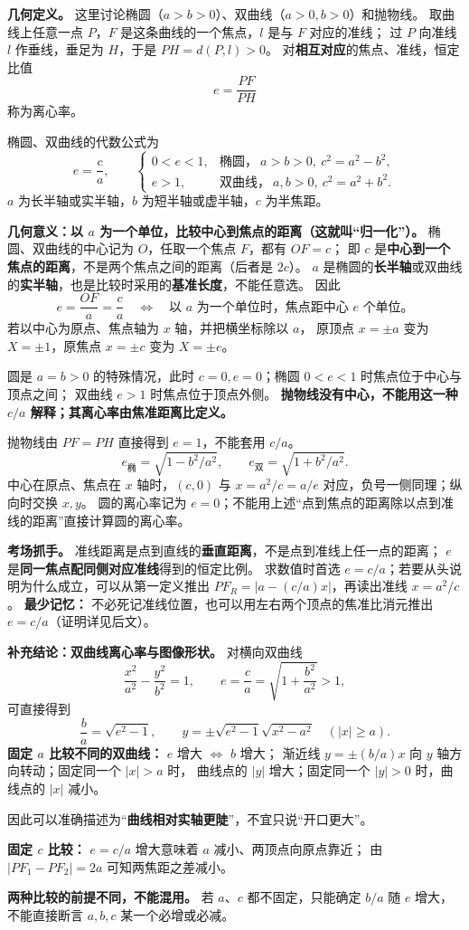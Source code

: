 \begin{statementbox}
\textbf{几何定义。} 这里讨论椭圆（$a>b>0$）、双曲线（$a>0,b>0$）和抛物线。
取曲线上任意一点 $P$，$F$ 是这条曲线的一个焦点，$l$ 是与 $F$ 对应的准线；
过 $P$ 向准线 $l$ 作垂线，垂足为 $H$，于是 $PH=d(P,l)>0$。
对\textbf{相互对应}的焦点、准线，恒定比值
\[
 \boxed{e=\frac{PF}{PH}}
\]
称为离心率。

椭圆、双曲线的代数公式为
\[
 \boxed{e=\frac ca},\qquad
 \begin{cases}
 0<e<1,&\text{椭圆，}\ a>b>0,\ c^2=a^2-b^2,\\
 e>1,&\text{双曲线，}\ a,b>0,\ c^2=a^2+b^2.
 \end{cases}
\]
$a$ 为长半轴或实半轴，$b$ 为短半轴或虚半轴，$c$ 为半焦距。

\medskip
\textbf{几何意义：以 $a$ 为一个单位，比较中心到焦点的距离（这就叫“归一化”）。}
椭圆、双曲线的中心记为 $O$，任取一个焦点 $F$，都有 $OF=c$；
即 $c$ 是\textbf{中心到一个焦点的距离}，不是两个焦点之间的距离（后者是 $2c$）。
$a$ 是椭圆的\textbf{长半轴}或双曲线的\textbf{实半轴}，也是比较时采用的\textbf{基准长度}，不能任意选。
因此
\[
 \boxed{e=\frac{OF}{a}=\frac ca}
 \quad\Longleftrightarrow\quad
 \text{以 }a\text{ 为一个单位时，焦点距中心 }e\text{ 个单位。}
\]
若以中心为原点、焦点轴为 $x$ 轴，并把横坐标除以 $a$，
原顶点 $x=\pm a$ 变为 $X=\pm1$，原焦点 $x=\pm c$ 变为 $X=\pm e$。


圆是 $a=b>0$ 的特殊情况，此时 $c=0,e=0$；椭圆 $0<e<1$ 时焦点位于中心与顶点之间；
双曲线 $e>1$ 时焦点位于顶点外侧。
\textbf{抛物线没有中心，不能用这一种 $c/a$ 解释；其离心率由焦准距离比定义。}

抛物线由 $PF=PH$ 直接得到 $\boxed{e=1}$，不能套用 $c/a$。
\[
 e_{\text{椭}}=\sqrt{1-b^2/a^2},\qquad
 e_{\text{双}}=\sqrt{1+b^2/a^2}.
\]
中心在原点、焦点在 $x$ 轴时，$(c,0)$ 与 $x=a^2/c=a/e$ 对应，负号一侧同理；纵向时交换 $x,y$。
圆的离心率记为 $e=0$；不能用上述“点到焦点的距离除以点到准线的距离”直接计算圆的离心率。


\medskip
\textbf{考场抓手。} 准线距离是点到直线的\textbf{垂直距离}，不是点到准线上任一点的距离；
$e$ 是\textbf{同一焦点配同侧对应准线}得到的恒定比例。
求数值时首选 $e=c/a$；若要从头说明为什么成立，可以从第一定义推出
$PF_R=|a-(c/a)x|$，再读出准线 $x=a^2/c$。
\textbf{最少记忆：} 不必死记准线位置，也可以用左右两个顶点的焦准比消元推出 $e=c/a$（证明详见后文）。


\medskip
\textbf{补充结论：双曲线离心率与图像形状。}
对横向双曲线
\[
 \frac{x^2}{a^2}-\frac{y^2}{b^2}=1,\qquad
 e=\frac ca=\sqrt{1+\frac{b^2}{a^2}}>1,
\]
可直接得到
\[
 \boxed{\frac ba=\sqrt{e^2-1}},\qquad
 \boxed{y=\pm\sqrt{e^2-1}\sqrt{x^2-a^2}\quad(|x|\ge a)}.
\]
\textbf{固定 $a$ 比较不同的双曲线：} $e$ 增大 $\Leftrightarrow$ $b$ 增大；
渐近线 $y=\pm(b/a)x$ 向 $y$ 轴方向转动；固定同一个 $|x|>a$ 时，
曲线点的 $|y|$ 增大；固定同一个 $|y|>0$ 时，曲线点的 $|x|$ 减小。

因此可以准确描述为“\textbf{曲线相对实轴更陡}”，不宜只说“开口更大”。

\textbf{固定 $c$ 比较：} $e=c/a$ 增大意味着 $a$ 减小、两顶点向原点靠近；
由 $|PF_1-PF_2|=2a$ 可知两焦距之差减小。

\textbf{两种比较的前提不同，不能混用。}
若 $a$、$c$ 都不固定，只能确定 $b/a$ 随 $e$ 增大，不能直接断言 $a,b,c$ 某一个必增或必减。

\end{statementbox}
